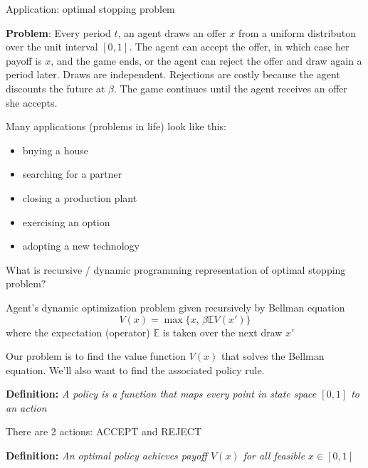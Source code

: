 \documentclass[11pt, aspectratio=169]{beamer}
\begin{document}
\begin{frame}{Application: optimal stopping problem}

\textbf{Problem}: Every period $t$, an agent draws an offer $x$ from a uniform distributon over the unit interval $[0, 1]$. The agent can accept the offer, in which case her payoff is $x$, and the game ends, or the agent can reject the offer and draw again a period later. Draws are independent. Rejections are costly because the agent discounts the future at $\beta$. The game continues until the agent receives an offer she accepts.


\vspace{5mm}
Many applications (problems in life) look like this: 
\begin{itemize}
	\item buying a house
	\item searching for a partner
	\item closing a production plant
	\item exercising an option
	\item adopting a new technology
\end{itemize}

\end{frame}


\begin{frame}{}

What is recursive / dynamic programming representation of optimal stopping problem?

\pause
\vspace{5mm}
Agent's dynamic optimization problem given recursively by Bellman equation 
\begin{equation*}
	V(x) = \max \Big\{ x, \, \beta \mathbb{E} V(x') \Big\}
\end{equation*}
where the expectation (operator) $\mathbb{E}$ is taken over the next draw $x'$


\vspace{5mm} 
Our problem is to find the value function $V(x)$ that solves the Bellman equation. We'll also want to find the associated policy rule.

\vspace{6mm}
\textbf{Definition: }\textit{A policy is a function that maps every point in state space $[0, 1]$ to an action}

	{\footnotesize There are 2 actions: ACCEPT and REJECT}

\vspace{6mm}
\textbf{Definition: }\textit{An optimal policy achieves payoff $V(x)$ for all feasible $x \in [0, 1]$}
\end{frame}
\end{document}
